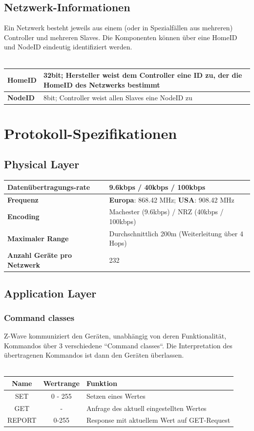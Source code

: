 \documentclass[a4paper,11pt]{article}
\begin{document}
\subsection*{Netzwerk-Informationen}
Ein Netzwerk besteht jeweils aus einem (oder in Spezialfällen aus mehreren) Controller und mehreren Slaves. Die Komponenten können über eine HomeID und NodeID eindeutig identifiziert werden.\\\\
\begin{tabular}{| p{3.5cm} | p{10cm} |}
	\hline
	\textbf{HomeID} & 32bit; Hersteller weist dem Controller eine ID zu, der die HomeID des Netzwerks bestimmt\\\hline
	\textbf{NodeID} & 8bit; Controller weist allen Slaves eine NodeID zu\\\hline
\end{tabular}

\section*{Protokoll-Spezifikationen}

\subsection*{Physical Layer}
\begin{tabular}{| p{3.5cm} | p{10cm} |}
	\hline
	\textbf{Datenübertragungs-rate} & 9.6kbps / 40kbps / 100kbps\\\hline
	\textbf{Frequenz} &  {\textbf{Europa}: 868.42 MHz; \textbf{USA}: 908.42 MHz} \\\hline
	\textbf{Encoding} & Machester (9.6kbps) / NRZ (40kbps / 100kbps) \\\hline
	\textbf{Maximaler Range} & Durchschnittlich 200m (Weiterleitung über 4 Hops) \\\hline
	\textbf{Anzahl Geräte pro Netzwerk} & 232 \\\hline
\end{tabular}

\subsection*{Application Layer}
\subsubsection*{Command classes}
Z-Wave kommuniziert den Geräten, unabhängig von deren Funktionalität, Kommandos über 3 verschiedene ``Command classes``. Die Interpretation des übertragenen Kommandos ist dann den Geräten überlassen.\\\\
\begin{tabular}{| c | c | p{6cm} |}
	\hline
	\textbf{Name} & \textbf{Wertrange}& \textbf{Funktion}\\\hline
	SET & 0 - 255 & Setzen eines Wertes \\\hline
	GET & - & Anfrage des aktuell eingestellten Wertes \\\hline
	REPORT & 0-255 & Response mit aktuellem Wert auf GET-Request\\\hline
\end{tabular}
~
\newpage
\end{document}
